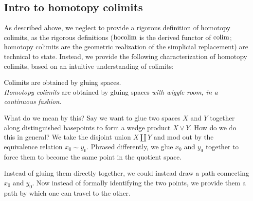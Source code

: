 \subsection{Intro to homotopy colimits}

As described above, we neglect to provide a rigorous definition of homotopy colimits, as the rigorous definitions ($\mathop{\operatorname*{hocolim}}$ is the derived functor of $\mathop{\operatorname*{colim}}$; homotopy colimits are the geometric realization of the simplicial replacement) are technical to state. Instead, we provide the following characterization of homotopy colimits, based on an intuitive understanding of colimits:
\begin{center}
    Colimits are obtained by gluing spaces.\\
    \textit{Homotopy colimits} are obtained by gluing spaces \textit{with wiggle room, in a continuous fashion}.
\end{center}

What do we mean by this? Say we want to glue two spaces $X$ and $Y$ together along distinguished basepoints to form a wedge product $X \vee Y$. How do we do this in general? We take the disjoint union $X \amalg Y$ and mod out by the equivalence relation $x_0 \sim y_0$. Phrased differently, we glue $x_0$ and $y_0$ together to force them to become the same point in the quotient space.

Instead of gluing them directly together, we could instead draw a path connecting $x_0$ and $y_0$. Now instead of formally identifying the two points, we provide them a path by which one can travel to the other.

\begin{figure}[H]
  \centering
\end{figure}




